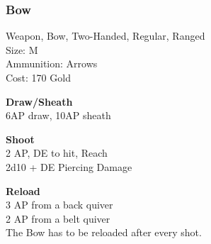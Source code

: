 \subsubsection{Bow}\label{weapon:bow}
Weapon, Bow, Two-Handed, Regular, Ranged\\
Size: M\\
Ammunition: Arrows\\
Cost: 170 Gold

\textbf{Draw/Sheath}\\
6AP draw, 10AP sheath

\textbf{Shoot}\\
2 AP, DE to hit,  Reach\\
2d10 + \texttimes DE Piercing Damage

\textbf{Reload}\\
3 AP from a back quiver\\
2 AP from a belt quiver\\
The Bow has to be reloaded after every shot.